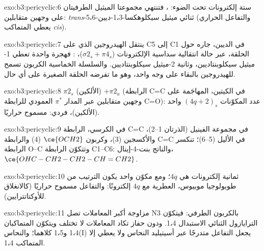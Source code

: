 \begin{solution}{exo:b3:pericyclic:6}
ستة إلكترونات تحت الضوء: ، فتنتهي مجموعتا الميثيل الطرفيتان على
وجهين متقابلين: \textit{trans}-5،6-ثنائي ميثيل سيكلوهكسا-1،3-ديين (والتفاعل الحراري يعطي
المتماكب \textit{cis}).
\end{solution}

\begin{solution}{exo:b3:pericyclic:7}
ينتقل الهيدروجين الذي على C5 إلى C1 في الديين، جاره حول الحلقة،
عبر حالة انتقالية سداسية الإلكترونات ($\sigma2_s + \pi4_s$)، : فهجرة واحدة
تعطي 1-ميثيل سيكلوبنتاديين، وثانية 2-ميثيل سيكلوبنتاديين. والسلسلة الخماسية الكربون تسمح
للهيدروجين بالبقاء على وجه واحد، وهو ما تفرضه الحلقة الصغيرة على أي حال.
\end{solution}

\begin{solution}{exo:b3:pericyclic:8}
$\pi2_s$ (الألكين) $+ \pi2_a$ (الرابطة C=C في الكيتين، المهاجَمة على وجهين متقابلين عبر
المدار $\pi^*$ العمودي للرابطة C=O): عدد المكوّنات $(4q + 2)_s$ واحد (الألكين)، فردي:
مسموح حراريًا.
\end{solution}

\begin{solution}{exo:b3:pericyclic:9}
في الكرسي، الرابطة C=C في مجموعة الفينيل (الذرتان 1--2)، والأكسجين (3)، وكربون
$\ce{OCH2}$ (4) والرابطة C=C في الأليل (5--6)؛ تنكسر الرابطة O--C وتتكوّن الرابطة C1--C6:
والناتج بنت-4-إينال،
$\ce{OHC-CH2-CH2-CH=CH2}$.
\end{solution}

\begin{solution}{exo:b3:pericyclic:10}
ثمانية إلكترونات هي $4q$؛ ومع مكوّن واحد  يكون الترتيب من طوبولوجيا
موبيوس، العطرية مع $4q$ إلكترونًا:  
والتفاعل مسموح حراريًا (كالانغلاق  للأوكتاتترايين).
\end{solution}

\begin{solution}{exo:b3:pericyclic:11}
مزاوجة أكبر المعاملات تصل N3 بالكربون الطرفي: فيتكوّن
الترايازول الثنائي الاستبدال 1،4. ودون حفاز تكاد المعاملات لا تختلف 
ويتكوّن المتماكبان 1،4 و1،5 كلاهما؛ والنحاس(I) يجعل التفاعل متدرجًا عبر
أسيتيليد النحاس ولا يعطي إلا المتماكب 1،4.
\end{solution}

